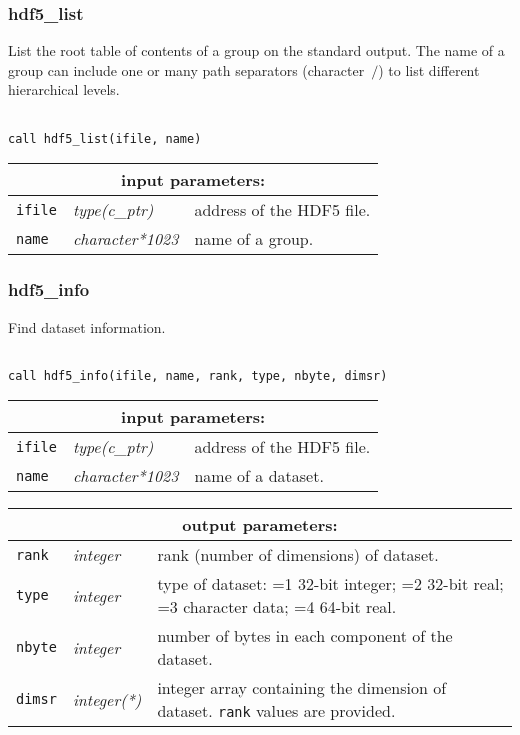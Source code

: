 \subsubsection{hdf5\_list}

List the root table of contents of a group on the standard output. The name of a group can include one or many path separators (character~$\slash$)
to list different hierarchical levels.

\begin{verbatim}

call hdf5_list(ifile, name)
\end{verbatim}

\noindent
\begin{tabular}{|p{1.5cm}|p{3cm}|p{10cm}|}
\hline
\multicolumn{3}{|c|}{\bf input parameters:} \\
\hline
{\tt ifile} & {\it type(c\_ptr)} & address of the HDF5 file. \\
\hline
{\tt name} & {\it character*1023} & name of a group. \\
\hline
\end{tabular}

\subsubsection{hdf5\_info}

Find dataset information.

\begin{verbatim}

call hdf5_info(ifile, name, rank, type, nbyte, dimsr)
\end{verbatim}

\noindent
\begin{tabular}{|p{1.5cm}|p{3cm}|p{10cm}|}
\hline
\multicolumn{3}{|c|}{\bf input parameters:} \\
\hline
{\tt ifile} & {\it type(c\_ptr)} & address of the HDF5 file. \\
\hline
{\tt name} & {\it character*1023} & name of a dataset. \\
\hline
\end{tabular}

\vskip 0.8cm

\noindent
\begin{tabular}{|p{1.5cm}|p{3cm}|p{10cm}|}
\hline
\multicolumn{3}{|c|}{\bf output parameters:} \\
\hline
{\tt rank} & {\it integer} & rank (number of dimensions) of dataset. \\
\hline
{\tt type} & {\it integer} & type of dataset: =1 32-bit integer; 
                                    =2 32-bit real; =3 character data; 
				    =4 64-bit real. \\
\hline
{\tt nbyte} & {\it integer} & number of bytes in each component of the dataset. \\
\hline
{\tt dimsr} & {\it integer(*)} & integer array containing the dimension of dataset. {\tt rank} values are provided. \\
\hline
\end{tabular}

